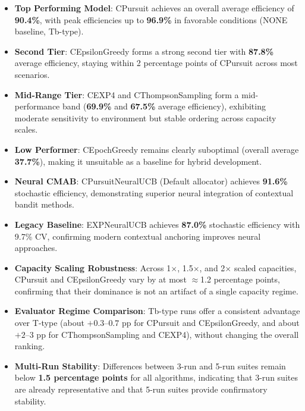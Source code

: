 \documentclass[12pt,a4paper]{article}
\newcommand{\performance}[1]{\textcolor{performancecolor}{\textbf{#1}}}
\newcommand{\critical}[1]{\textcolor{criticalcolor}{\textbf{#1}}}
\newcommand{\success}[1]{\textcolor{successcolor}{\textbf{#1}}}
\newcommand{\legacy}[1]{\textcolor{legacycolor}{\textbf{#1}}}
\newcommand{\neural}[1]{\textcolor{neuralcolor}{\textbf{#1}}}
\begin{document}
\begin{tcolorbox}[colback=highlightcolor!30,colframe=performancecolor,title=\textbf{Key Experimental Results Summary (3-run/5-run, 1$\times$–2$\times$ Capacities, T/Tb Regimes)}]
\begin{itemize}
\item \performance{Top Performing Model}: CPursuit achieves an overall average efficiency of \textbf{90.4\%}, with peak efficiencies up to \textbf{96.9\%} in favorable conditions (NONE baseline, Tb-type).
\item \performance{Second Tier}: CEpsilonGreedy forms a strong second tier with \textbf{87.8\%} average efficiency, staying within 2 percentage points of CPursuit across most scenarios.
\item \performance{Mid-Range Tier}: CEXP4 and CThompsonSampling form a mid-performance band (\textbf{69.9\%} and \textbf{67.5\%} average efficiency), exhibiting moderate sensitivity to environment but stable ordering across capacity scales.
\item \critical{Low Performer}: CEpochGreedy remains clearly suboptimal (overall average \textbf{37.7\%}), making it unsuitable as a baseline for hybrid development.
\item \neural{Neural CMAB}: CPursuitNeuralUCB (Default allocator) achieves \textbf{91.6\%} stochastic efficiency, demonstrating superior neural integration of contextual bandit methods.
\item \legacy{Legacy Baseline}: EXPNeuralUCB achieves \textbf{87.0\%} stochastic efficiency with 9.7\% CV, confirming modern contextual anchoring improves neural approaches.
\item \success{Capacity Scaling Robustness}: Across 1$\times$, 1.5$\times$, and 2$\times$ scaled capacities, CPursuit and CEpsilonGreedy vary by at most $\approx$1.2 percentage points, confirming that their dominance is not an artifact of a single capacity regime.
\item \success{Evaluator Regime Comparison}: Tb-type runs offer a consistent advantage over T-type (about $+0.3$–$0.7$ pp for CPursuit and CEpsilonGreedy, and about $+2$–$3$ pp for CThompsonSampling and CEXP4), without changing the overall ranking.
\item \success{Multi-Run Stability}: Differences between 3-run and 5-run suites remain below \textbf{1.5 percentage points} for all algorithms, indicating that 3-run suites are already representative and that 5-run suites provide confirmatory stability.
\end{itemize}
\end{tcolorbox}
\end{document}
